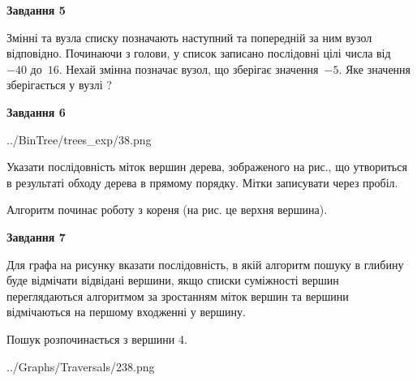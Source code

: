 \documentclass[12pt, ukrainian]{article}
\begin{document}
{\begin {large}
{\begin {center}\textbf{Завдання 5}\end {center}}\par
Змінні  та  вузла списку позначають наступний та попередній за ним вузол відповідно. Починаючи з голови, у список записано послідовні цілі числа від~$-40$ до~$16$. Нехай змінна  позначає вузол, що зберігає значення~$-5$.
Яке значення зберігається у вузлі  ?\par
\newpage

{\begin {center}\textbf{Завдання 6}\end {center}}\par

\begin{center}
	{../BinTree/trees_exp/38.png}
\end{center}
Указати послідовність міток вершин дерева, зображеного на рис., що утвориться в результаті обходу дерева в прямому порядку. Мітки записувати через пробіл.\par Алгоритм починає роботу з кореня (на рис. це верхня вершина).\par
\newpage

{\begin {center}\textbf{Завдання 7}\end {center}}\par
Для графа на рисунку вказати послідовність, в якій алгоритм пошуку в глибину буде відмічати відвідані вершини, якщо списки суміжності вершин переглядаються алгоритмом за зростанням міток вершин та вершини відмічаються на першому вход\-женні у вершину.\par
Пошук розпочинається з вершини 4.\par

\begin{center}
	{../Graphs/Traversals/238.png}
\end{center}\par
\newpage


\end{large}}
\end{document}
